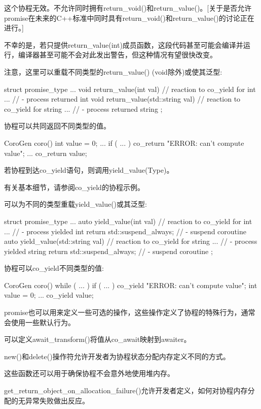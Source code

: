这个协程无效。不允许同时拥有return\_void()和return\_value()。[关于是否允许promise在未来的C++标准中同时具有return\_void()和return\_value()的讨论正在进行。]

不幸的是，若只提供return\_value(int)成员函数，这段代码甚至可能会编译并运行，编译器甚至可能不会对此发出警告，但这种情况有望很快改变。

注意，这里可以重载不同类型的return\_value() (void除外)或使其泛型:

\begin{cpp}
struct promise_type {
	...
	void return_value(int val) { // reaction to co_yield for int
		... // - process returned int
	}
	void return_value(std::string val) { // reaction to co_yield for string
		... // - process returned string
	}
};
\end{cpp}

协程可以共同返回不同类型的值。

\begin{cpp}
CoroGen coro()
{
	int value = 0;
	...
	if ( ... ) {
		co_return "ERROR: can't compute value";
	}
	...
	co_return value;
}
\end{cpp}


若协程到达co\_yield语句，则调用yield\_value(Type)。

有关基本细节，请参阅co\_yield的协程示例。

可以为不同的类型重载yield\_value()或其泛型:

\begin{cpp}
struct promise_type {
	...
	auto yield_value(int val) { // reaction to co_yield for int
		... // - process yielded int
		return std::suspend_always{}; // - suspend coroutine
	}
	auto yield_value(std::string val) { // reaction to co_yield for string
		... // - process yielded string
		return std::suspend_always{}; // - suspend coroutine
	}
};
\end{cpp}

协程可以co\_yield不同类型的值:

\begin{cpp}
CoroGen coro()
{
	while ( ... ) {
		if ( ... ) {
			co_yield "ERROR: can't compute value";
		}
		int value = 0;
		...
		co_yield value;
	}
}
\end{cpp}


promise也可以用来定义一些可选的操作，这些操作定义了协程的特殊行为，通常会使用一些默认行为。


可以定义await\_transform()将值从co\_await映射到awaiter。


new()和delete()操作符允许开发者为协程状态分配内存定义不同的方式。

这些函数还可以用于确保协程不会意外地使用堆内存。


get\_return\_object\_on\_allocation\_failure()允许开发者定义，如何对协程内存分配的无异常失败做出反应。








